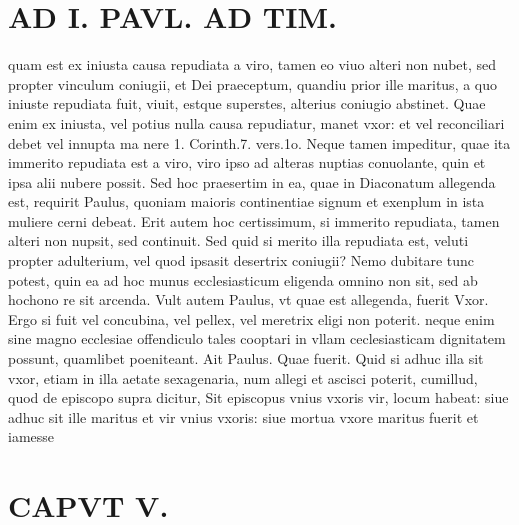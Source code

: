 \documentclass{article}
\begin{document}
\begin{pages}
\section*{AD I. PAVL. AD TIM. }
\marginpar{[ p.276 ]}\pstart quam est ex iniusta causa repudiata a viro, tamen eo viuo alteri non nubet, sed propter vinculum coniugii, et Dei praeceptum, quandiu prior ille maritus, a quo iniuste repudiata fuit, viuit, estque superstes, alterius coniugio abstinet. Quae enim ex iniusta, vel potius nulla causa repudiatur, manet vxor: et vel reconciliari debet vel innupta ma nere 1. Corinth.7. vers.1o. Neque tamen impeditur, quae ita immerito repudiata est a viro, viro ipso ad alteras nuptias conuolante, quin et ipsa alii nubere possit. Sed hoc praesertim in ea, quae in Diaconatum allegenda est, requirit Paulus, quoniam maioris continentiae signum et exenplum in ista muliere cerni debeat. Erit autem hoc certissimum, si immerito repudiata, tamen alteri non nupsit, sed continuit. Sed quid si merito illa repudiata est, veluti propter adulterium, vel quod ipsasit desertrix coniugii? Nemo dubitare tunc potest, quin ea ad hoc munus ecclesiasticum eligenda omnino non sit, sed ab hochono re sit arcenda. Vult autem Paulus, vt quae est allegenda, fuerit Vxor. Ergo si fuit vel concubina, vel pellex, vel meretrix eligi non poterit. neque enim sine magno ecclesiae offendiculo tales cooptari in vllam ceclesiasticam dignitatem possunt, quamlibet poeniteant. Ait Paulus. Quae fuerit. Quid si adhuc illa sit vxor, etiam in illa aetate sexagenaria, num allegi et ascisci poterit, cumillud, quod de episcopo supra dicitur, Sit episcopus vnius vxoris vir, locum habeat: siue adhuc sit ille maritus et vir vnius vxoris: siue mortua vxore maritus fuerit et iamesse  \pend
\section*{CAPVT  V. }
\marginpar{[ p.2 ]}\pstart {}
{}

\end{pages}
\end{document}

